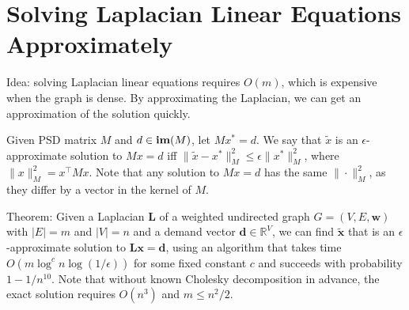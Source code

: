 \section{Solving Laplacian Linear Equations Approximately}

Idea: solving Laplacian linear equations requires $O(m)$, which is expensive when the graph is dense. By approximating the Laplacian, we can get an approximation of the solution quickly.

Given PSD matrix $M$ and $d \in \operatorname{\textbf{im}}(M)$, let $M x^* = d$. We say that $\tilde{x}$ is an $\epsilon$-approximate solution to $Mx=d$ iff $\|\tilde{x} - x^*\|_M^2 \le \epsilon \|x^*\|_M^2$, where $\|x\|_M^2 = x^\top M x$. Note that any solution to $M x = d$ has the same $\|\cdot\|_M^2$, as they differ by a vector in the kernel of $M$.

Theorem: Given a Laplacian $\boldsymbol{L}$ of a weighted undirected graph $G=(V, E, \boldsymbol{w})$ with $|E|=m$ and $|V|=n$ and a demand vector $\boldsymbol{d} \in \mathbb{R}^{V}$, we can find $\tilde{\boldsymbol{x}}$ that is an $\epsilon$-approximate solution to $\boldsymbol{L x}=\boldsymbol{d}$, using an algorithm that takes time $O\left(m \log ^{c} n \log (1 / \epsilon)\right)$ for some fixed constant $c$ and succeeds with probability $1-1 / n^{10}$. Note that without known Cholesky decomposition in advance, the exact solution requires $O(n^3)$ and $m \le n^2 / 2$.